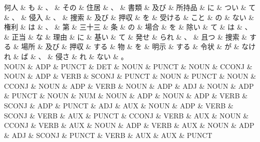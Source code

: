 \documentclass[tikz,border=5pt]{standalone}
\begin{document}
\fontsize{5pt}{6pt}\selectfont
\begin{dependency}[edge unit distance=6.0pt]
    \begin{deptext}[column sep=0.3em]
        何人 \& も \& 、 \& その \& 住居 \& 、 \& 書類 \& 及び \& 所持品 \& に \& つい \& て \& 、 \& 侵入 \& 、 \& 捜索 \& 及び \& 押収 \& を \& 受ける \& こと \& の \& ない \& 権利 \& は \& 、 \& 第 \& 三十三 \& 条 \& の \& 場合 \& を \& 除い \& て \& は \& 、 \& 正当 \& な \& 理由 \& に \& 基い \& て \& 発せ \& られ \& 、 \& 且つ \& 捜索 \& する \& 場所 \& 及び \& 押収 \& する \& 物 \& を \& 明示 \& する \& 令状 \& が \& なけれ \& ば \& 、 \& 侵さ \& れ \& ない \& 。\\
        NOUN \& ADP \& PUNCT \& DET \& NOUN \& PUNCT \& NOUN \& CCONJ \& NOUN \& ADP \& VERB \& SCONJ \& PUNCT \& NOUN \& PUNCT \& NOUN \& CCONJ \& NOUN \& ADP \& VERB \& NOUN \& ADP \& ADJ \& NOUN \& ADP \& PUNCT \& NOUN \& NUM \& NOUN \& ADP \& NOUN \& ADP \& VERB \& SCONJ \& ADP \& PUNCT \& ADJ \& AUX \& NOUN \& ADP \& VERB \& SCONJ \& VERB \& AUX \& PUNCT \& CCONJ \& VERB \& AUX \& NOUN \& CCONJ \& VERB \& AUX \& NOUN \& ADP \& VERB \& AUX \& NOUN \& ADP \& ADJ \& SCONJ \& PUNCT \& VERB \& AUX \& AUX \& PUNCT\\
    \end{deptext}
\end{dependency}
\end{document}
